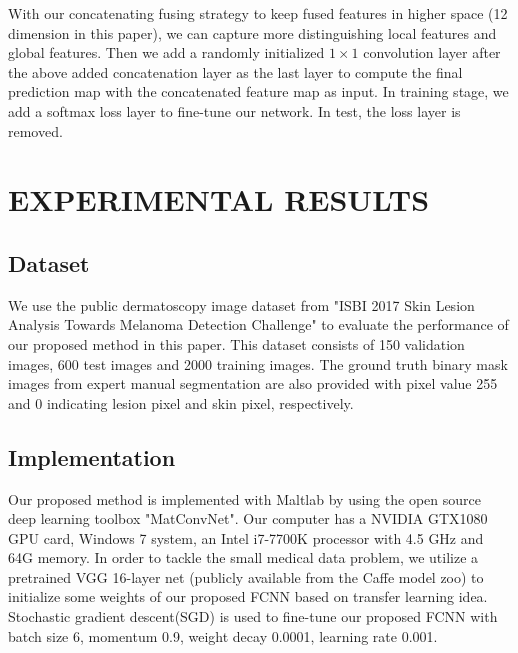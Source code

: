 \documentclass{article}
\begin{document}
With our concatenating fusing strategy to keep fused features in higher space (12 dimension in this paper), we can capture more distinguishing local features and global features. Then we add a randomly initialized $1\times1$ convolution layer after the above added concatenation layer as the last layer to compute the final prediction map with the concatenated feature map as input. In training stage, we add a softmax loss layer to fine-tune our network. In test, the loss layer is removed. 

\section{EXPERIMENTAL RESULTS}
\label{sec:experiment}

\subsection{Dataset}
We use the public dermatoscopy image dataset from  
"ISBI 2017 Skin Lesion Analysis Towards Melanoma Detection Challenge"\cite{2017-ISBI-SkinLesionChallenge} to evaluate the performance of our proposed method in this paper.
This dataset consists of 150 validation images, 600 test images and 2000 training images.
The ground truth binary mask images from expert manual segmentation are also provided  with pixel value 255 and 0 indicating lesion pixel and skin pixel, respectively. 


\subsection{Implementation}
Our proposed method is implemented with Maltlab by using the open source deep learning toolbox  "MatConvNet"\cite{vedaldi15matconvnet}. Our computer has a NVIDIA GTX1080 GPU card, Windows 7 system, an Intel i7-7700K processor with 4.5 GHz and 64G memory.  
In order to tackle the small medical data problem, we utilize a pretrained VGG 16-layer net (publicly available from the Caffe model zoo) to initialize some weights of our proposed FCNN based on transfer learning idea.  
Stochastic gradient descent(SGD) is used to fine-tune our proposed FCNN with batch size 6, momentum 0.9, weight decay 0.0001, learning rate 0.001.  
\end{document}
